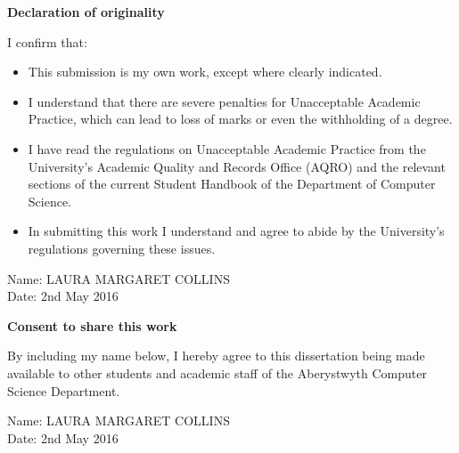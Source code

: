 \thispagestyle{empty}

\begin{center}
    {\LARGE\bf Declaration of originality}
\end{center}

I confirm that:

\begin{itemize}
\item{This submission is my own work, except where clearly indicated.}

\item{I understand that there are severe penalties for Unacceptable Academic Practice, which can lead to loss of marks or even the withholding of a degree.}

\item{I have read the regulations on Unacceptable Academic Practice from the University's Academic Quality and Records Office (AQRO) and the relevant sections of the current Student Handbook of the Department of Computer Science.}

\item{In submitting this work I understand and agree to abide by the University's regulations governing these issues.}
\end{itemize}

\vspace{2em}
Name: LAURA MARGARET COLLINS \\

\vspace{1em}
Date: 2nd May 2016 \\

\vspace{1em}
\begin{center}
    {\LARGE\bf Consent to share this work}
\end{center}

By including my name below, I hereby agree to this dissertation being made available to other
students and academic staff of the Aberystwyth Computer Science Department.

\vspace{2em}
Name: LAURA MARGARET COLLINS  \\

\vspace{1em}
Date: 2nd May 2016 \\

